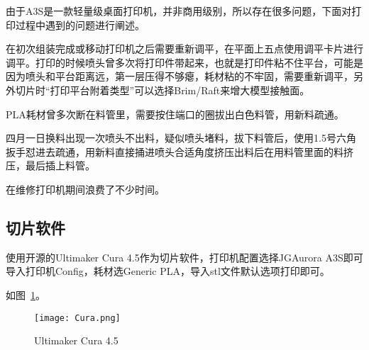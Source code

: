 由于A3S是一款轻量级桌面打印机，并非商用级别，所以存在很多问题，下面对打印过程中遇到的问题进行阐述。

在初次组装完成或移动打印机之后需要重新调平，在平面上五点使用调平卡片进行调平。打印的时候喷头曾多次将打印件带起来，也就是打印件粘不住平台，可能是因为喷头和平台距离远，第一层压得不够瘪，耗材粘的不牢固，需要重新调平，另外切片时“打印平台附着类型”可以选择Brim/Raft来增大模型接触面。

PLA耗材曾多次断在料管里，需要按住端口的圈拔出白色料管，用新料疏通。

四月一日换料出现一次喷头不出料，疑似喷头堵料，拔下料管后，使用1.5号六角扳手怼进去疏通，用新料直接捅进喷头合适角度挤压出料后在用料管里面的料挤压，最后插上料管。

在维修打印机期间浪费了不少时间。

\subsection{切片软件}

使用开源的Ultimaker Cura 4.5作为切片软件，打印机配置选择JGAurora A3S即可导入打印机Config，耗材选Generic PLA，导入stl文件默认选项打印即可。

如图~\ref{fig:Cura}。

\begin{figure}[htbp]
    \centering
    \texttt{[image: Cura.png]}
    \caption{Ultimaker Cura 4.5}
    \label{fig:Cura}
\end{figure}

